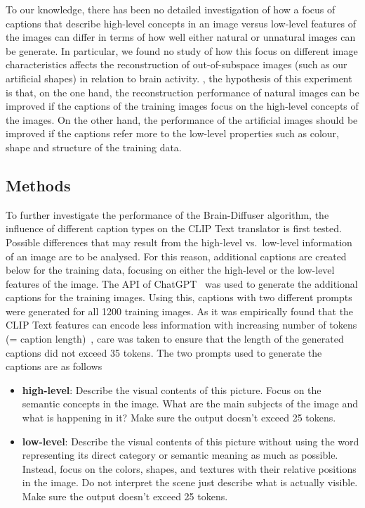 To our knowledge, there has been no detailed investigation of how a focus of captions that describe high-level concepts in an image versus low-level features of the images can differ in terms of how well either natural or unnatural images can be generate. In particular, we found no study of how this focus on different image characteristics affects the reconstruction of out-of-subspace images (such as our artificial shapes) in relation to brain activity. , the hypothesis of this experiment is that, on the one hand, the reconstruction performance of natural images can be improved if the captions of the training images focus on the high-level concepts of the images. On the other hand, the performance of the artificial images should be improved if the captions refer more to the low-level properties such as colour, shape and structure of the training data.


\subsection{Methods}
To further investigate the performance of the Brain-Diffuser algorithm, the influence of different caption types on the CLIP Text translator is first tested. Possible differences that may result from the high-level vs.\ low-level information of an image are to be analysed. For this reason, additional captions are created below for the training data, focusing on either the high-level or the low-level features of the image. The API of ChatGPT~\cite{OpenAI_ChatGPT_2024} was used to generate the additional captions for the training images. Using this, captions with two different prompts were generated for all 1200 training images. As it was empirically found that the CLIP Text features can encode less information with increasing number of tokens (= caption length)~\cite{zhangLongCLIPUnlockingLongText2024}, care was taken to ensure that the length of the generated captions did not exceed 35 tokens. The two prompts used to generate the captions are as follows
\begin{itemize}
    \item \textbf{high-level}: Describe the visual contents of this picture. Focus on the semantic concepts in the image. What are the main subjects of the image and what is happening in it? Make sure the output doesn't exceed 25 tokens.
    \item \textbf{low-level}: Describe the visual contents of this picture without using the word representing its direct category or semantic meaning as much as possible. Instead, focus on the colors, shapes, and textures with their relative positions in the image. Do not interpret the scene just describe what is actually visible. Make sure the output doesn't exceed 25 tokens.
\end{itemize}

